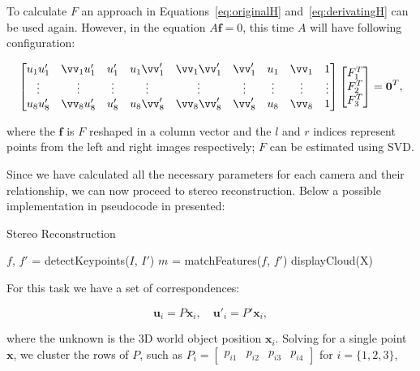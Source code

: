 \documentclass[12pt]{article}
\begin{document}
To calculate $F$ an approach in Equations~\ref{eq:originalH} and~\ref{eq:derivatingH} can be used again.
However, in the equation $A\mathbf{f} = 0$, this time $A$ will have following configuration:

\begin{equation}
\begin{bmatrix}
u_1 u_1' & 	\vv_1 u_1' & u_1' & u_1 \vv_1' & \vv_1 \vv_1' & \vv_1' & u_1 & \vv_1 & 1 \\
\vdots & \vdots & \vdots & \vdots & \vdots & \vdots & \vdots & \vdots & \vdots  \\
u_8 u_8' & \vv_8 u_8' & u_8' & u_8 \vv_8' & \vv_8 \vv_8' & \vv_8' & u_8 & \vv_8 & 1 
\end{bmatrix}
\begin{bmatrix}
F_1^T \\
F_2^T \\
F_3^T \\
\end{bmatrix}
= \mathbf{0}^T,
\end{equation}

where the $\mathbf{f}$ is $F$ reshaped in a column vector and the $l$ and $r$ indices represent points from the left and right images respectively; $F$ can be estimated using SVD.

Since we have calculated all the necessary parameters for each camera and their relationship, we can now proceed to stereo reconstruction.
Below a possible implementation in pseudocode in presented:

\begin{algorithm}[H]
 \caption{Stereo Reconstruction}
 $f$, $f'$ = detectKeypoints($I$, $I'$)\;
 $m$ = matchFeatures($f$, $f'$)\;
 displayCloud(X)\;
\end{algorithm}

For this task we have a set of correspondences:

\begin{equation}
 \mathbf{u}_{i} = P\mathbf{x}_i, \quad \mathbf{u'}_{i} = P'\mathbf{x}_i,
\end{equation}

where the unknown is the 3D world object position $\mathbf{x}_i$.
Solving for a single point $\mathbf{x}$, we cluster the rows of $P$, such as $P_i = \begin{bmatrix} p_{i1} & p_{i2} & p_{i3} & p_{i4}  \end{bmatrix}$ for $i = \lbrace 1, 2, 3 \rbrace$,
\end{document}
